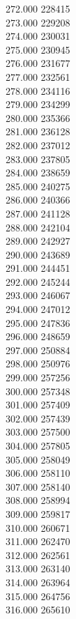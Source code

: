 { 272.000	228415 \\
 273.000	229208 \\
 274.000	230031 \\
 275.000	230945 \\
 276.000	231677 \\
 277.000	232561 \\
 278.000	234116 \\
 279.000	234299 \\
 280.000	235366 \\
 281.000	236128 \\
 282.000	237012 \\
 283.000	237805 \\
 284.000	238659 \\
 285.000	240275 \\
 286.000	240366 \\
 287.000	241128 \\
 288.000	242104 \\
 289.000	242927 \\
 290.000	243689 \\
 291.000	244451 \\
 292.000	245244 \\
 293.000	246067 \\
 294.000	247012 \\
 295.000	247836 \\
 296.000	248659 \\
 297.000	250884 \\
 298.000	250976 \\
 299.000	257256 \\
 300.000	257348 \\
 301.000	257409 \\
 302.000	257439 \\
 303.000	257500 \\
 304.000	257805 \\
 305.000	258049 \\
 306.000	258110 \\
 307.000	258140 \\
 308.000	258994 \\
 309.000	259817 \\
 310.000	260671 \\
 311.000	262470 \\
 312.000	262561 \\
 313.000	263140 \\
 314.000	263964 \\
 315.000	264756 \\
 316.000	265610 \\
}
